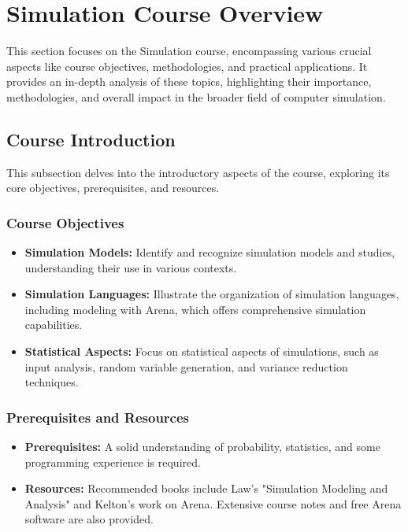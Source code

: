 \section{Simulation Course Overview}
This section focuses on the Simulation course, encompassing various crucial aspects like course objectives, methodologies, and practical applications. It provides an in-depth analysis of these topics, highlighting their importance, methodologies, and overall impact in the broader field of computer simulation.

\subsection{Course Introduction}
This subsection delves into the introductory aspects of the course, exploring its core objectives, prerequisites, and resources.

\subsubsection{Course Objectives}
\begin{itemize}
    \item \textbf{Simulation Models:} Identify and recognize simulation models and studies, understanding their use in various contexts.
    \item \textbf{Simulation Languages:} Illustrate the organization of simulation languages, including modeling with Arena, which offers comprehensive simulation capabilities.
    \item \textbf{Statistical Aspects:} Focus on statistical aspects of simulations, such as input analysis, random variable generation, and variance reduction techniques.
\end{itemize}

\subsubsection{Prerequisites and Resources}
\begin{itemize}
    \item \textbf{Prerequisites:} A solid understanding of probability, statistics, and some programming experience is required.
    \item \textbf{Resources:} Recommended books include Law's "Simulation Modeling and Analysis" and Kelton's work on Arena. Extensive course notes and free Arena software are also provided.
\end{itemize}


